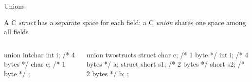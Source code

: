 \documentclass{plt}
\begin{document}
\begin{frame}[fragile]{Unions}

A C \emph{struct} has a separate space for each field; a C
\emph{union} shares one space among all fields

\begin{columns}
  \begin{column}[t]{0.5\textwidth}
\begin{C}
union intchar {
  int i;   /* 4 bytes */
  char c;  /* 1 byte  */
};
\end{C}

  \end{column}
  \begin{column}[t]{0.5\textwidth}
\begin{C}
union twostructs {
  struct {
    char c;   /* 1 byte */
    int i;    /* 4 bytes */
  } a;
  struct {
    short s1; /* 2 bytes */
    short s2; /* 2 bytes */
  } b;
};
\end{C}

  \end{column}
\end{columns}

\end{frame}
\end{document}
